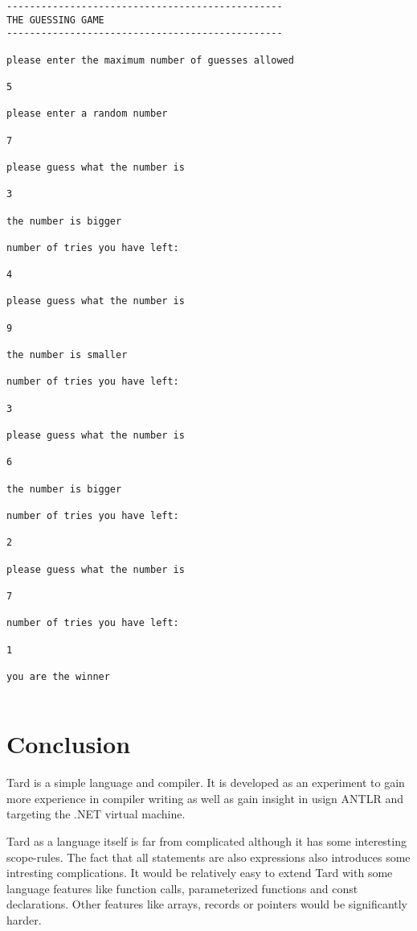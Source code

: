 \documentclass{report}
\begin{document}
\begin{verbatim}
------------------------------------------------
THE GUESSING GAME
------------------------------------------------

please enter the maximum number of guesses allowed

5

please enter a random number

7

please guess what the number is

3

the number is bigger

number of tries you have left:

4

please guess what the number is

9

the number is smaller

number of tries you have left:

3

please guess what the number is

6

the number is bigger

number of tries you have left:

2

please guess what the number is

7

number of tries you have left:

1

you are the winner


\end{verbatim}

\chapter{Conclusion}

Tard is a simple language and compiler. It is developed as an
experiment to gain more experience in compiler writing as well as
gain insight in usign ANTLR and targeting the .NET virtual machine.

Tard as a language itself is far from complicated although it has
some interesting scope-rules. The fact that all statements are also
expressions also introduces some intresting complications. It would
be relatively easy to extend Tard with some language features like
function calls, parameterized functions and const declarations.
Other features like arrays, records or pointers would be
significantly harder.
\end{document}

